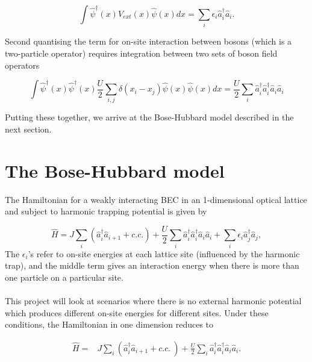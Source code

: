 \documentclass[a4paper,10pt]{article}
\begin{document}
\begin{equation}
 \int  \hat{\psi}^{\dagger}(x) V_{ext}(x)  \hat{\psi}(x)dx = \sum_i \epsilon_i \hat{a}_i^{\dagger}\hat{a}_i.
\end{equation}

Second quantising the term for on-site interaction between bosons (which is a two-particle operator) requires integration between two sets of boson field operators

\begin{equation}
 \int  \hat{\psi}^{\dagger}(x)\hat{\psi}^{\dagger}(x) \frac{U}{2}\sum_{i,j}\delta(x_{i}-x_{j})  \hat{\psi}(x) \hat{\psi}(x) dx = \frac{U}{2}\sum_i \hat{a}_i^{\dagger}\hat{a}_i^{\dagger}\hat{a}_i\hat{a}_i
\end{equation}


Putting these together, we arrive at the Bose-Hubbard model described in the next section.
\newpage




\section{The Bose-Hubbard model}

The Hamiltonian for a weakly interacting BEC in an 1-dimensional optical lattice and subject to harmonic trapping potential is given by

\begin{equation}
 \hat{H}=J\sum_{i}(\hat{a}^\dagger_{i}\hat{a}_{i+1}+c.c.)+\frac{U}{2}\sum_{i}\hat{a}^\dagger_{i}\hat{a}^\dagger_{i}\hat{a}_{i}\hat{a}_{i}+\sum_{i}{\epsilon_i}\hat{a}^\dagger_{j}\hat{a}_{j},
\end{equation}
The $\epsilon_i$'s refer to on-site energies at each lattice site (influenced by the harmonic trap), and the middle term gives an interaction energy when there is more than one particle 
on a particular site.
\\\\
This project will look at scenarios where there is no external harmonic potential which produces different on-site energies for different sites.  
Under these conditions, the Hamiltonian in one dimension reduces to

\begin{equation}
\begin{align*}
\hat{H}=&J\sum_{i}(\hat{a}^\dagger_{i}\hat{a}_{i+1}+c.c.\ ) +\frac{U}{2}\sum_{i}\hat{a}^\dagger_{i}\hat{a}^\dagger_{i}\hat{a}_{i}\hat{a}_{i}.
\end{align*}
\end{equation}
\end{document}
